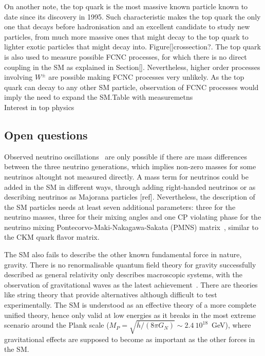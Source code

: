 On another note, the top quark is the most massive known particle known to date since its discovery in 1995. Such characteristic makes the top quark the only one that decays before hadronisation and an excellent candidate to study new particles, from much more massive ones that might decay to the top quark to lighter exotic particles that might decay into. Figure[]crossection?. The top quark is also used to measure possible FCNC processes, for which there is no direct coupling in the SM as explained in Section[]. Nevertheless, higher order processes involving $W^\pm$ are possible making FCNC processes very unlikely. As the top quark can decay to any other SM particle, observation of FCNC processes would imply the need to expand the SM.Table with measuremetns\\

Interest in top physics

\subsection{Open questions}

Observed neutrino oscillations~\cite{neutrinoosc} are only possible if there are mass differences between the three neutrino generations, which implies non-zero masses for some neutrinos altought not measured directly. A mass term for neutrinos could be added in the SM in different ways, through adding right-handed neutrinos or as describing neutrinos as Majorana particles [ref]. Nevertheless, the description of the SM particles needs at least seven additional parameters: three for the neutrino masses, three for their mixing angles and one CP violating phase for the neutrino mixing Pontecorvo-Maki-Nakagawa-Sakata (PMNS) matrix~\cite{}, similar to the CKM quark flavor matrix.

The SM also fails to describe the other known fundamental force in nature, gravity. There is no renormalisable quantum field theory for gravity successfully described as general relativity only describes macroscopic systems, with the observation of gravitational waves as the latest achievement~\cite{}. There are theories like string theory that provide alternatives although difficult to test experimentally. The SM is understood as an effective theory of a more complete unified theory, hence only valid at low energies as it breaks in the most extreme scenario around the Plank scale ($M_P=\sqrt{\bar{h}/(8\pi G_N)}\sim 2.4\ 10^{18}$~GeV), where gravitational effects are supposed to become as important as the other forces in the SM. 

